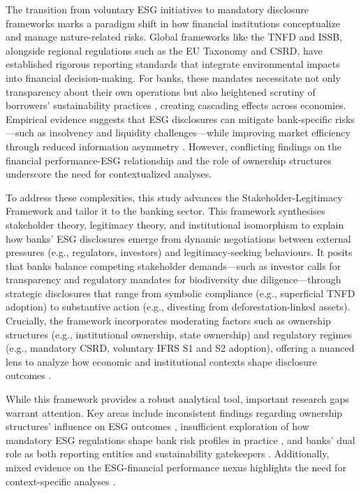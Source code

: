 \documentclass[
  authoryear]{elsarticle}
\begin{document}
The transition from voluntary ESG initiatives to mandatory disclosure
frameworks marks a paradigm shift in how financial institutions
conceptualize and manage nature-related risks. Global frameworks like
the TNFD and ISSB, alongside regional regulations such as the EU
Taxonomy and CSRD, have established rigorous reporting standards that
integrate environmental impacts into financial decision-making. For
banks, these mandates necessitate not only transparency about their own
operations but also heightened scrutiny of borrowers' sustainability
practices \citep[see][]{WANG2023}, creating cascading effects across
economies. Empirical evidence suggests that ESG disclosures can mitigate
bank-specific risks---such as insolvency and liquidity
challenges---while improving market efficiency through reduced
information asymmetry \citep{GANGI2019, SCHOLTENS2019, GANGWANI2024}.
However, conflicting findings on the financial performance-ESG
relationship and the role of ownership structures underscore the need
for contextualized analyses.

To address these complexities, this study advances the
Stakeholder-Legitimacy Framework and tailor it to the banking sector.
This framework synthesises stakeholder theory, legitimacy theory, and
institutional isomorphism to explain how banks' ESG disclosures emerge
from dynamic negotiations between external pressures (e.g., regulators,
investors) and legitimacy-seeking behaviours. It posits that banks
balance competing stakeholder demands---such as investor calls for
transparency and regulatory mandates for biodiversity due
diligence---through strategic disclosures that range from symbolic
compliance (e.g., superficial TNFD adoption) to substantive action
(e.g., divesting from deforestation-linked assets). Crucially, the
framework incorporates moderating factors such as ownership structures
(e.g., institutional ownership, state ownership) and regulatory regimes
(e.g., mandatory CSRD, voluntary IFRS S1 and S2 adoption), offering a
nuanced lens to analyze how economic and institutional contexts shape
disclosure outcomes \citep{CAMPBELL2007, AGUINIS2012}.

While this framework provides a robust analytical tool, important
research gaps warrant attention. Key areas include inconsistent findings
regarding ownership structures' influence on ESG outcomes
\citep[see][]{DYCK2019, ALUCHNA2022}, insufficient exploration of how
mandatory ESG regulations shape bank risk profiles in practice
\citep[see][]{WANG2023}, and banks' dual role as both reporting entities
and sustainability gatekeepers \citep[see][]{SMITH2022}. Additionally,
mixed evidence on the ESG-financial performance nexus highlights the
need for context-specific analyses \citep[see][]{BORGES2024}.
\end{document}
